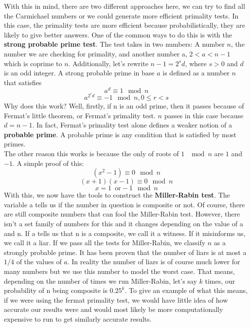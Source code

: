 \documentclass[conference]{IEEEtran}
\begin{document}
With this in mind, there are two different approaches here, we can try to find all the Carmichael numbers or we could generate more efficient primality tests. In this case, the primality tests are more efficient because probabilistically, they are likely to give better answers. One of the common ways to do this is with the \textbf{strong probable prime test}. The test takes in two numbers: A number $n$, the number we are checking for primality, and another number a, $2 < a < n - 1$ which is coprime to $n$. Additionally, let's rewrite $n - 1 = 2^s d$, where $s > 0$ and $d$ is an odd integer. A strong probable prime in base $a$ is defined as a number $n$ that satisfies 
\[
    a^d \equiv 1 \mod n
\]
\[
    a^{2^r d} \equiv -1 \mod n, 0 \leq r < s 
\]
Why does this work? Well, firstly, if n is an odd prime, then it passes because of Fermat's little theorem, or Fermat's primality test. $n$ passes in this case because $d = n - 1$. In fact, Fermat's primality test alone defines a weaker notion of a \textbf{probable prime}. A probable prime is any condition that is satisfied by most primes. \\
The other reason this works is because the only of roots of $1$ $\mod n$ are $1$ and $-1$. A simple proof of this:
\[
    (x^2 - 1) \equiv 0 \mod n
\]
\[
    (x + 1)(x - 1) \equiv 0 \mod n
\]
\[
    x = 1\,\,\, \text{or} -1 \mod n
\]
With this, we now have the tools to construct the \textbf{Miller-Rabin test}. The variable a tells us if the number in question is composite or not. Of course, there are still composite numbers that can fool the Miller-Rabin test. However, there isn't a set family of numbers for this and it changes depending on the value of a and n. If a tells us that n is a composite, we call it a witness. If it misinforms us, we call it a liar. If we pass all the tests for Miller-Rabin, we classify $n$ as a strongly probable prime. It has been proven that the number of liars is at most a \href{https://doi.org/10.1016%2F0022-314X%2880%2990084-0}{$1/4$} of the values of $a$. In reality the number of liars is of course much lower for many numbers but we use this number to model the worst case. That means, depending on the number of times we run Miller-Rabin, let's say $k$ times, our probability of n being composite is $0.25^k$. To give an example of what this means, if we were using the fermat primality test, we would have little idea of how accurate our results were and would most likely be more computationally expensive to run to get similarly accurate results.
\end{document}
